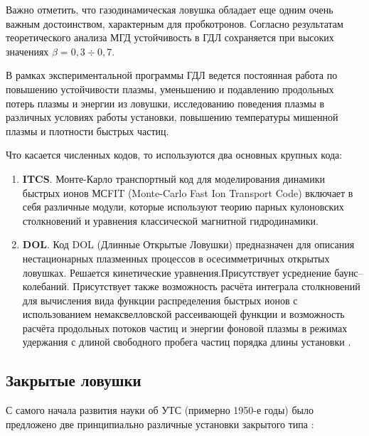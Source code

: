 Важно отметить, что газодинамическая ловушка обладает еще одним очень важным достоинством, характерным для пробкотронов. Согласно результатам теоретического анализа МГД устойчивость в ГДЛ сохраняется при высоких значениях $\beta = 0,3 \div 0,7$.

В рамках экспериментальной программы ГДЛ ведется постоянная работа по повышению устойчивости плазмы, уменьшению и подавлению продольных потерь плазмы и энергии из ловушки, исследованию поведения плазмы в различных условиях работы установки, повышению температуры мишенной плазмы и плотности быстрых частиц.


Что касается численных кодов, то используются два основных крупных кода:
\begin{enumerate}
\item \textbf{ITCS}. Монте-Карло транспортный код для моделирования динамики быстрых ионов МСFIT (Monte-Carlo Fast Ion Transport Code) включает в себя различные модули, которые используют теорию парных кулоновских столкновений и уравнения классической магнитной гидродинамики.  

\item \textbf{DOL}. Код DOL (Длинные Открытые Ловушки) предназначен для описания нестационарных плазменных процессов в осесимметричных открытых ловушках. Решается кинетические уравнения.Присутствует усреднение баунс--колебаний. Присутствует также возможность расчёта интеграла столкновений для вычисления вида функции распределения быстрых ионов с использованием немаксвелловской рассеивающей функции и возможность расчёта продольных потоков частиц и энергии фоновой плазмы в режимах удержания с длиной свободного пробега частиц порядка длины установки \cite{DOL_code}.
\end{enumerate}


\subsection{Закрытые ловушки}

С самого начала развития науки об УТС (примерно 1950-е годы) было предложено две принципиально различные установки закрытого типа \cite{Kubic2007}:

